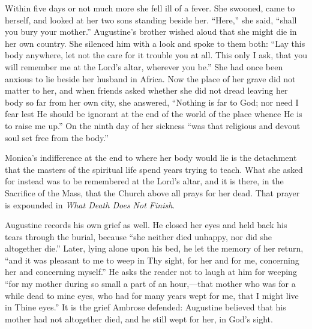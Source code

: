 Within five days or not much more she fell ill of a fever. She swooned, came to herself, and looked at her two sons standing beside her. ``Here,'' she said, ``shall you bury your mother.'' Augustine's brother wished aloud that she might die in her own country. She silenced him with a look and spoke to them both: ``Lay this body anywhere, let not the care for it trouble you at all. This only I ask, that you will remember me at the Lord's altar, wherever you be.'' She had once been anxious to lie beside her husband in Africa. Now the place of her grave did not matter to her, and when friends asked whether she did not dread leaving her body so far from her own city, she answered, ``Nothing is far to God; nor need I fear lest He should be ignorant at the end of the world of the place whence He is to raise me up.'' On the ninth day of her sickness ``was that religious and devout soul set free from the body.''

Monica's indifference at the end to where her body would lie is the detachment that the masters of the spiritual life spend years trying to teach. What she asked for instead was to be remembered at the Lord's altar, and it is there, in the Sacrifice of the Mass, that the Church above all prays for her dead. That prayer is expounded in \emph{What Death Does Not Finish}.

Augustine records his own grief as well. He closed her eyes and held back his tears through the burial, because ``she neither died unhappy, nor did she altogether die.'' Later, lying alone upon his bed, he let the memory of her return, ``and it was pleasant to me to weep in Thy sight, for her and for me, concerning her and concerning myself.'' He asks the reader not to laugh at him for weeping ``for my mother during so small a part of an hour,---that mother who was for a while dead to mine eyes, who had for many years wept for me, that I might live in Thine eyes.'' It is the grief Ambrose defended: Augustine believed that his mother had not altogether died, and he still wept for her, in God's sight.
